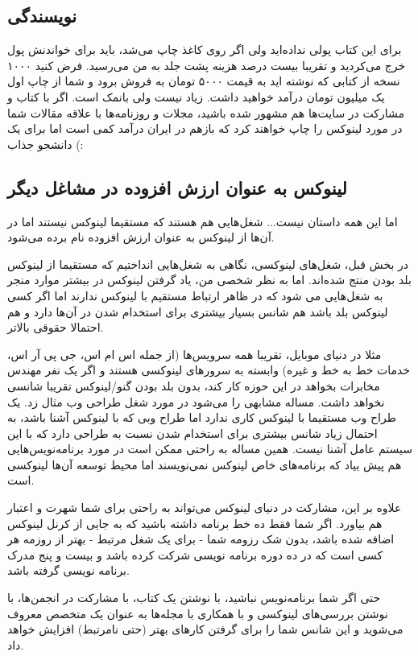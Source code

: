 \subsection*{نویسندگی}
برای این کتاب پولی نداده‌اید ولی اگر روی کاغذ چاپ می‌شد، باید برای خواندنش پول خرج می‌کردید و تقریبا بیست درصد هزینه پشت جلد به من می‌رسید. فرض کنید ۱۰۰۰ نسخه از کتابی که نوشته اید به قیمت ۵۰۰۰ تومان به فروش برود و شما از چاپ اول یک میلیون تومان درآمد خواهید داشت. زیاد نیست ولی بانمک است. اگر با کتاب و مشارکت در سایت‌ها هم مشهور شده باشید، مجلات و روزنامه‌ها با علاقه مقالات شما در مورد لینوکس را چاپ خواهند کرد که بازهم در ایران درآمد کمی است اما برای یک دانشجو جذاب (:
\subsection*{لینوکس به عنوان ارزش افزوده در مشاغل دیگر}
اما این همه داستان نیست... شغل‌هایی هم هستند که مستقیما لینوکس نیستند اما در آن‌ها از لینوکس به عنوان ارزش افزوده نام برده می‌شود.

در بخش قبل‌، شغل‌های لینوکسی، نگاهی به شغل‌هایی انداختیم که مستقیما از لینوکس بلد بودن منتج شده‌اند. اما به نظر شخصی من، یاد گرفتن لینوکس در بیشتر موارد منجر به شغل‌هایی می شود که در ظاهر ارتباط مستقیم با لینوکس ندارند اما اگر کسی لینوکس بلد باشد هم شانس بسیار بیشتری برای استخدام شدن در آن‌ها دارد و هم احتمالا حقوقی بالاتر.

مثلا در دنیای موبایل، تقریبا همه سرویس‌ها (از جمله اس ام اس، جی پی آر اس، خدمات خط به خط و غیره) وابسته به سرورهای لینوکسی هستند و اگر یک نفر مهندس مخابرات بخواهد در این حوزه کار کند، بدون بلد بودن گنو/لینوکس تقریبا شانسی نخواهد داشت. مساله مشابهی را می‌شود در مورد شغل طراحی وب مثال زد. یک طراح وب مستقیما با لینوکس کاری ندارد اما طراح وبی که با لینوکس آشنا باشد، به احتمال زیاد شانس بیشتری برای استخدام شدن نسبت به طراحی دارد که با این سیستم عامل آشنا نیست. همین مساله به راحتی ممکن است در مورد برنامه‌نویس‌هایی هم پیش بیاد که برنامه‌های خاص لینوکس نمی‌نویسند اما محیط توسعه آن‌ها لینوکسی است.

علاوه بر این، مشارکت در دنیای لینوکس می‌تواند به راحتی برای شما شهرت و اعتبار هم بیاورد. اگر شما فقط ده خط برنامه داشته باشید که به جایی از کرنل لینوکس اضافه شده باشد، بدون شک رزومه شما - برای یک شغل مرتبط - بهتر از روزمه هر کسی است که در ده دوره برنامه نویسی  شرکت کرده باشد و بیست و پنج مدرک برنامه نویسی گرفته باشد.

حتی اگر شما برنامه‌نویس نباشید، با نوشتن یک کتاب، با مشارکت در انجمن‌ها، با نوشتن بررسی‌های لینوکسی و با همکاری با مجله‌ها به عنوان یک متخصص معروف می‌شوید و این شانس شما را برای گرفتن کارهای بهتر (حتی نامرتبط) افزایش خواهد داد.
